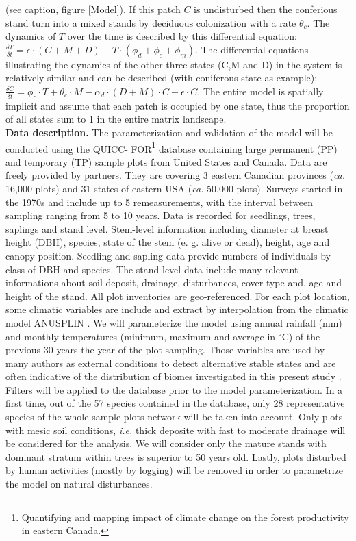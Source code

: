 (see caption, figure \ref{Model}). If this patch $C$ is undisturbed then the
conferious stand turn into a mixed stands by deciduous colonization with a
rate $\theta_c$. The dynamics of $T$ over the time is described by this
differential equation: $\frac{\delta T}{\delta t} = \epsilon \cdot (C+M+D) - T
\cdot (\phi_d + \phi_c + \phi_m)$. The differential equations illustrating the
dynamics of the other three states (C,M and D) in the system is relatively
similar and can be described (with coniferous state as example):
$\frac{\delta C}{\delta t} = \phi_c \cdot T + \theta_c \cdot M - \alpha_d
\cdot (D+M)\cdot C - \epsilon \cdot C$. The entire model is spatially implicit
and assume that each patch is occupied by one state, thus the proportion of
all states sum to 1 in the entire matrix landscape. \\

\textbf{Data description.} The parameterization and validation of the model
will be conducted using the QUICC- FOR\footnote{Quantifying and mapping impact
of climate change on the forest productivity in eastern Canada.} database
containing large permanent (PP) and temporary (TP) sample plots from United
States and Canada. Data are freely provided by partners. They are covering 3
eastern Canadian provinces (\textit{ca.} 16,000 plots) and 31 states of
eastern USA (\textit{ca.} 50,000 plots). Surveys started in the 1970s and
include up to 5 remeasurements, with the interval between sampling ranging
from 5 to 10 years. Data is recorded for seedlings, trees, saplings and stand
level. Stem-level information including diameter at breast height (DBH),
species, state of the stem (e. g. alive or dead), height, age and canopy
position. Seedling and sapling data provide numbers of individuals by class of
DBH and species. The stand-level data include many relevant informations about
soil deposit, drainage, disturbances, cover type and, age and height of the
stand. All plot inventories are geo-referenced. For each plot location, some
climatic variables are include and extract by interpolation from the climatic
model ANUSPLIN \cite{McKenney2011}. We will parameterize the model using
annual rainfall (mm) and monthly temperatures (minimum, maximum and average in
\ensuremath{^\circ}C) of the previous 30 years the year of the plot sampling.
Those variables are used by many authors as external conditions to detect
alternative stable states and are often indicative of the distribution of
biomes investigated in this present study
\cite{Goldblum2010,Hirota2011,Scheffer2012}. Filters will be applied to the
database prior to the model parameterization. In a first time, out of the 57
species contained in the  database, only 28 representative species of the
whole sample plots network will be taken into account. Only plots with mesic
soil conditions, \textit{i.e.} thick deposite with fast to moderate drainage
will be considered for the analysis. We will consider only the mature stands
with dominant stratum within trees is superior to 50 years old. Lastly, plots
disturbed by human activities (mostly by logging) will be removed in order to
parametrize the model on natural disturbances. \\

